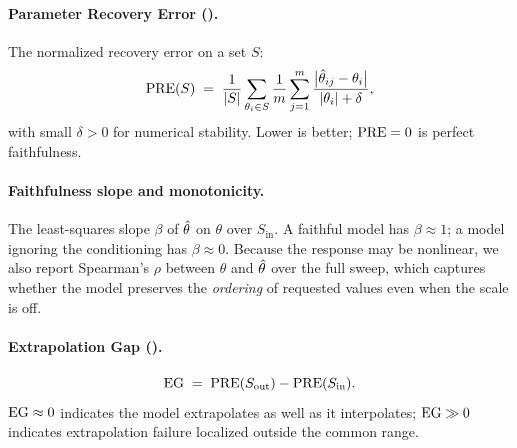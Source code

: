 \documentclass[10pt,twocolumn,letterpaper]{article}
\begin{document}
\paragraph{Parameter Recovery Error (\PRE).}
The normalized recovery error on a set $S$:
\begin{equation}
\mathrm{PRE}(S) \;=\; \frac{1}{|S|}\sum_{\theta_i\in S}
   \frac{1}{m}\sum_{j=1}^{m}
   \frac{\big|\hat{\theta}_{ij}-\theta_i\big|}{|\theta_i|+\delta},
\end{equation}
with small $\delta>0$ for numerical stability. Lower is better; $\mathrm{PRE}=0$ is
perfect faithfulness.

\paragraph{Faithfulness slope and monotonicity.}
The least-squares slope $\beta$ of $\hat{\theta}$ on $\theta$ over $S_\text{in}$.
A faithful model has $\beta\approx 1$; a model ignoring the conditioning has
$\beta\approx 0$. Because the response may be nonlinear, we also report
Spearman's $\rho$ between $\theta$ and $\hat{\theta}$ over the full sweep, which
captures whether the model preserves the \emph{ordering} of requested values
even when the scale is off.

\paragraph{Extrapolation Gap (\EG).}
\begin{equation}
\mathrm{EG} \;=\; \mathrm{PRE}(S_\text{out}) - \mathrm{PRE}(S_\text{in}).
\end{equation}
$\mathrm{EG}\approx 0$ indicates the model extrapolates as well as it interpolates;
$\mathrm{EG}\gg 0$ indicates extrapolation failure localized outside the common range.
\end{document}
